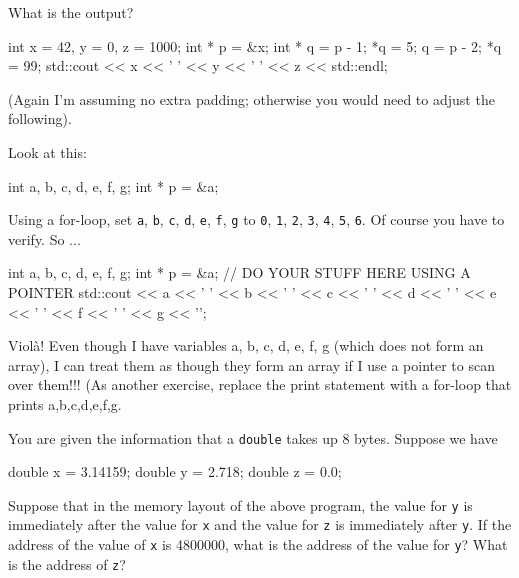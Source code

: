 \begin{ex}
What is the output?

\begin{consolethree}[escapeinside=||]
int x = 42, y = 0, z = 1000;
int * p = &x;
int * q = p - 1;
*q = 5;
q = p - 2;
*q = 99;
std::cout << x << ' ' << y << ' ' << z << std::endl;
\end{consolethree}

(Again I'm assuming no extra padding; otherwise you would need to adjust
the following).
\end{ex}

\begin{ex}
Look at this:

\begin{consolethree}[escapeinside=||]
int a, b, c, d, e, f, g;
int * p = &a;
\end{consolethree}

Using a for-loop, set \texttt{a}, \texttt{b}, \texttt{c}, \texttt{d}, \texttt{e},
\texttt{f}, \texttt{g} to \texttt{0}, \texttt{1}, \texttt{2}, \texttt{3}, \texttt{4},
\texttt{5}, \texttt{6}. Of course you have to verify. So ...

\begin{consolethree}[escapeinside=||]
int a, b, c, d, e, f, g;
int * p = &a;
// DO YOUR STUFF HERE USING A POINTER
std::cout << a << ' ' << b << ' ' << c << ' '
          << d << ' ' << e << ' ' << f << ' '
          << g << '\n';
\end{consolethree}

Violà! Even though I have variables a, b, c, d, e, f, g (which does not
form an array), I can treat them as though they form an array if I use a
pointer to scan over them!!! (As another exercise, replace the print
statement with a for-loop that prints a,b,c,d,e,f,g.
\end{ex}

\begin{ex}
You are given the information that a \texttt{double}
takes up 8 bytes. Suppose we have

\begin{consolethree}[escapeinside=||]
double x = 3.14159;
double y = 2.718;
double z = 0.0;
\end{consolethree}

Suppose that in the memory layout of the above program, the value
for \texttt{y} is immediately after the value for \texttt{x} and the value
for \texttt{z} is immediately after \texttt{y}. If the address of the value
of \texttt{x} is 4800000, what is the address of the value for \texttt{y}?
What is the address of \texttt{z}?
\end{ex}


